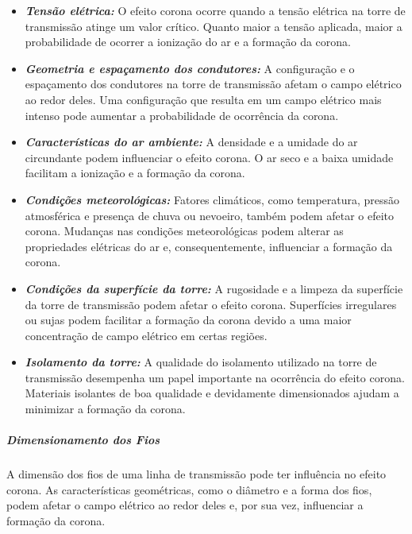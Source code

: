 \documentclass[a4paper, 12pt, onecolumn,singlespacing]{article}
\begin{document}
		\begin{itemize}
			\item \textbf{\textit{Tensão elétrica:}} O efeito corona ocorre quando a tensão elétrica na torre de transmissão atinge um valor crítico. Quanto maior a tensão aplicada, maior a probabilidade de ocorrer a ionização do ar e a formação da corona.
			
			\item \textbf{\textit{Geometria e espaçamento dos condutores:}} A configuração e o espaçamento dos condutores na torre de transmissão afetam o campo elétrico ao redor deles. Uma configuração que resulta em um campo elétrico mais intenso pode aumentar a probabilidade de ocorrência da corona.
			
			\item \textbf{\textit{Características do ar ambiente:}} A densidade e a umidade do ar circundante podem influenciar o efeito corona. O ar seco e a baixa umidade facilitam a ionização e a formação da corona.
			
			\item \textbf{\textit{Condições meteorológicas:}} Fatores climáticos, como temperatura, pressão atmosférica e presença de chuva ou nevoeiro, também podem afetar o efeito corona. Mudanças nas condições meteorológicas podem alterar as propriedades elétricas do ar e, consequentemente, influenciar a formação da corona.
			
			\item \textbf{\textit{Condições da superfície da torre:}} A rugosidade e a limpeza da superfície da torre de transmissão podem afetar o efeito corona. Superfícies irregulares ou sujas podem facilitar a formação da corona devido a uma maior concentração de campo elétrico em certas regiões.
			
			\item \textbf{\textit{Isolamento da torre:}} A qualidade do isolamento utilizado na torre de transmissão desempenha um papel importante na ocorrência do efeito corona. Materiais isolantes de boa qualidade e devidamente dimensionados ajudam a minimizar a formação da corona.
			
		\end{itemize}
		
		\subparagraph{Dimensionamento dos Fios} A dimensão dos fios de uma linha de transmissão pode ter influência no efeito corona. As características geométricas, como o diâmetro e a forma dos fios, podem afetar o campo elétrico ao redor deles e, por sua vez, influenciar a formação da corona.
		
\end{document}
